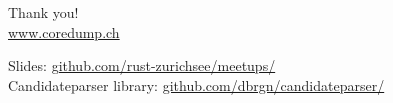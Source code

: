 \documentclass[aspectratio=1610,14pt,t]{beamer}
\begin{document}

{
\begin{frame}[standout]
	\begin{centering}
	{\Huge Thank you!}\\
	{\normalsize \url{www.coredump.ch}}\\
	\end{centering}
  {\small Slides: \url{github.com/rust-zurichsee/meetups/}}\\
  {\small Candidateparser library: \url{github.com/dbrgn/candidateparser/}}
  \vspace{3cm}
\end{frame}
}
\end{document}
